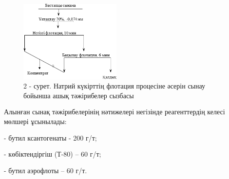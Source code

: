 \begin{figure}[H]
	\centering
	\includegraphics[width=0.45\textwidth]{media/gorn/image9}
	\caption*{2 - сурет. Натрий күкірттің флотация процесіне әсерін сынау бойынша ашық тәжірибелер сызбасы}
\end{figure}

\begin{multicols}{2}
Алынған сынақ тәжірибелерінің нәтижелері негізінде реагенттердің келесі
мөлшері ұсынылады:

- бутил ксантогенаты - 200 г/т;

- көбіктендіргіш (Т-80) -- 60 г/т;

- бутил аэрофлоты -- 60 г/т.
\end{multicols}
